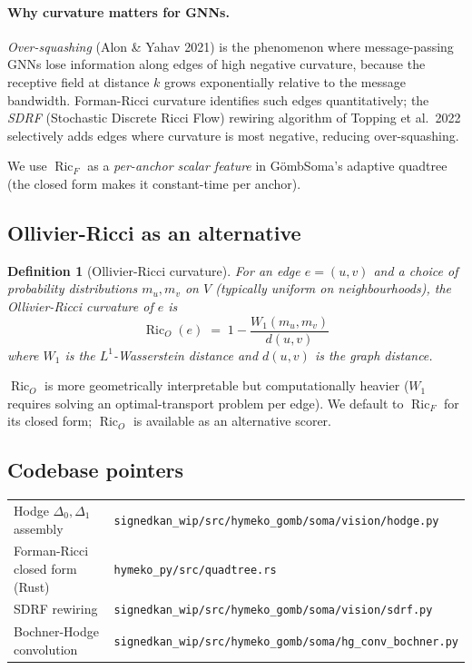 \documentclass[11pt,a4paper]{article}
\newtheorem{definition}[theorem]{Definition}
\theoremstyle{remark}
\DeclareMathOperator{\Ric}{Ric}
\newcommand{\GS}{G\"omb}
\begin{document}
\paragraph{Why curvature matters for GNNs.}
\emph{Over-squashing} (Alon \& Yahav 2021) is the phenomenon
where message-passing GNNs lose information along edges of high
negative curvature, because the receptive field at distance $k$
grows exponentially relative to the message bandwidth. Forman-Ricci
curvature identifies such edges quantitatively; the \emph{SDRF}
(Stochastic Discrete Ricci Flow) rewiring algorithm of Topping
et al.\ 2022 selectively adds edges where curvature is most
negative, reducing over-squashing.

We use $\Ric_F$ as a \emph{per-anchor scalar feature} in
\GS{}Soma's adaptive quadtree (the closed form makes it
constant-time per anchor).

\subsection{Ollivier-Ricci as an alternative}

\begin{definition}[Ollivier-Ricci curvature]
For an edge $e = (u, v)$ and a choice of probability distributions
$m_u, m_v$ on $V$ (typically uniform on neighbourhoods), the
\emph{Ollivier-Ricci curvature} of $e$ is
\[
  \Ric_O(e) \;=\; 1 - \frac{W_1(m_u, m_v)}{d(u, v)}
\]
where $W_1$ is the $L^1$-Wasserstein distance and $d(u, v)$ is
the graph distance.
\end{definition}

$\Ric_O$ is more geometrically interpretable but computationally
heavier ($W_1$ requires solving an optimal-transport problem per
edge). We default to $\Ric_F$ for its closed form; $\Ric_O$ is
available as an alternative scorer.

\subsection{Codebase pointers}

\begin{tabular}{ll}
Hodge $\Delta_0, \Delta_1$ assembly & \texttt{signedkan\_wip/src/hymeko\_gomb/soma/vision/hodge.py} \\
Forman-Ricci closed form (Rust) & \texttt{hymeko\_py/src/quadtree.rs} \\
SDRF rewiring & \texttt{signedkan\_wip/src/hymeko\_gomb/soma/vision/sdrf.py} \\
Bochner-Hodge convolution & \texttt{signedkan\_wip/src/hymeko\_gomb/soma/hg\_conv\_bochner.py} \\
\end{tabular}
\end{document}

